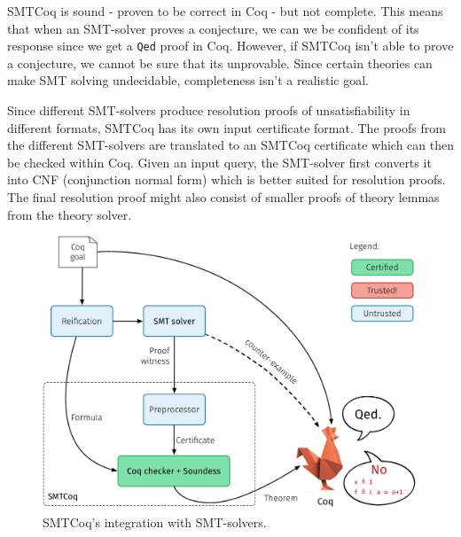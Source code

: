 \documentclass{article}
\begin{document}
	SMTCoq is sound - proven to be correct in Coq 
	- but not complete. This means that when an 
	SMT-solver proves a conjecture, we can we be 
	confident of its response since we get a 
	\texttt{Qed} proof in Coq. However, if 
	SMTCoq isn't able to prove a conjecture, 
	we cannot be sure that its unprovable.
	Since certain theories can make SMT 
	solving undecidable, completeness isn't a 
	realistic goal.	
	
	Since different SMT-solvers produce resolution 
	proofs of unsatisfiability in different formats, 
	SMTCoq has its own input certificate format. 
	The proofs from the different SMT-solvers are 
	translated to an SMTCoq certificate which 
	can then be checked within Coq. Given an input 
	query, the SMT-solver first converts it into CNF
	(conjunction normal form) which is better 
	suited for resolution proofs. The final 
	resolution proof might also consist of smaller 
	proofs of theory lemmas from the theory solver. 
	
	\begin{figure}[t]
		\centering
		\includegraphics[scale=0.4]{tactic_cex.pdf}
		\caption{SMTCoq's integration with SMT-solvers.}
		\label{fig:smtcoq}
	\end{figure}
	
\end{document}
